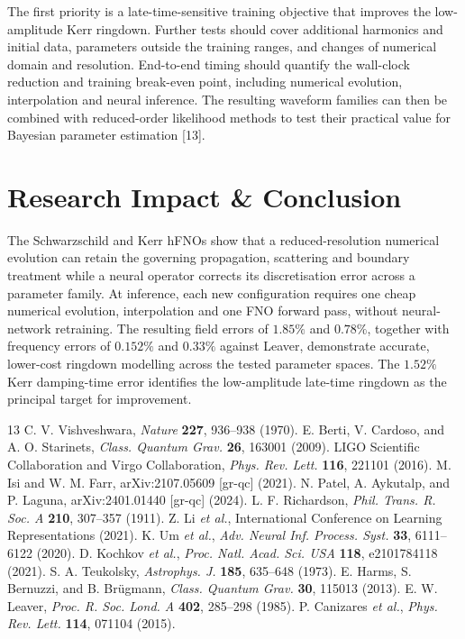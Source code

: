 \documentclass[10pt,a4paper,twocolumn]{article}
\begin{document}
The first priority is a late-time-sensitive training objective that
improves the low-amplitude Kerr ringdown. Further tests should cover
additional harmonics and initial data, parameters outside the training
ranges, and changes of numerical domain and resolution. End-to-end
timing should quantify the wall-clock reduction and training
break-even point, including numerical evolution, interpolation and
neural inference. The resulting waveform families can then be
combined with reduced-order likelihood methods to test their practical
value for Bayesian parameter estimation [13].

\section{Research Impact \& Conclusion}

The Schwarzschild and Kerr hFNOs show that a reduced-resolution
numerical evolution can retain the governing propagation, scattering
and boundary treatment while a neural operator corrects its
discretisation error across a parameter family. At inference, each
new configuration requires one cheap numerical evolution,
interpolation and one FNO forward pass, without neural-network
retraining. The resulting field errors of $1.85\%$ and $0.78\%$,
together with frequency errors of $0.152\%$ and $0.33\%$ against
Leaver, demonstrate accurate, lower-cost ringdown modelling across
the tested parameter spaces. The $1.52\%$ Kerr damping-time error
identifies the low-amplitude late-time ringdown as the principal
target for improvement.

\begin{thebibliography}{13}
\fontsize{6pt}{6.3pt}\selectfont
\setlength{\itemsep}{-1pt}
\setlength{\parskip}{0pt}
\setlength{\parsep}{0pt}
\setlength{\topsep}{2pt}
 C. V. Vishveshwara, \emph{Nature} \textbf{227},
936--938 (1970).
 E. Berti, V. Cardoso, and A. O. Starinets,
\emph{Class. Quantum Grav.} \textbf{26}, 163001 (2009).
 LIGO Scientific Collaboration and Virgo
Collaboration, \emph{Phys. Rev. Lett.} \textbf{116}, 221101 (2016).
 M. Isi and W. M. Farr, arXiv:2107.05609 [gr-qc]
(2021).
 N. Patel, A. Aykutalp, and P. Laguna,
arXiv:2401.01440 [gr-qc] (2024).
 L. F. Richardson, \emph{Phil. Trans. R. Soc.
A} \textbf{210}, 307--357 (1911).
 Z. Li \emph{et al.}, International Conference on
Learning Representations (2021).
 K. Um \emph{et al.}, \emph{Adv. Neural Inf. Process.
Syst.} \textbf{33}, 6111--6122 (2020).
 D. Kochkov \emph{et al.}, \emph{Proc. Natl.
Acad. Sci. USA} \textbf{118}, e2101784118 (2021).
 S. A. Teukolsky, \emph{Astrophys. J.}
\textbf{185}, 635--648 (1973).
 E. Harms, S. Bernuzzi, and B. Br\"ugmann,
\emph{Class. Quantum Grav.} \textbf{30}, 115013 (2013).
 E. W. Leaver, \emph{Proc. R. Soc. Lond. A}
\textbf{402}, 285--298 (1985).
 P. Canizares \emph{et al.}, \emph{Phys. Rev.
Lett.} \textbf{114}, 071104 (2015).
\end{thebibliography}
\end{document}
